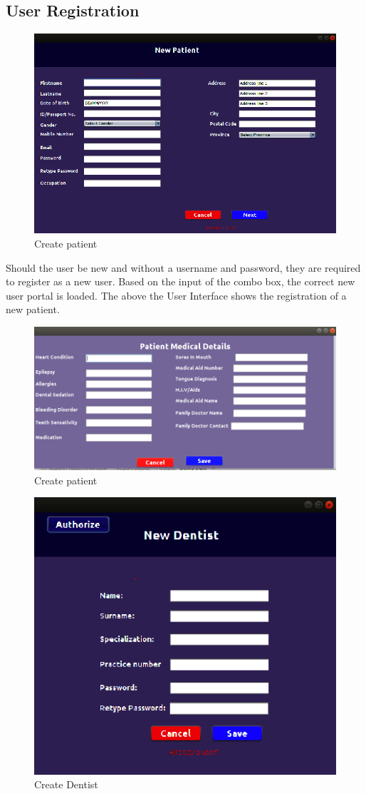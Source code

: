 \documentclass[11 pt]{article}
\begin{document}
\subsection{User Registration}
    \begin{figure}[h]
    \centering 
    \includegraphics[width=\linewidth]{UI_create_ patient.png}
    \caption{Create patient}
    \label{fig:create_patient}
    \end{figure}
 Should the user be new and without a username and password, they are required to register as a new user. Based on the input of the combo box, the correct new user portal is loaded. The above the User Interface shows the registration of a new patient. 
\begin{figure}[h]
    \centering 
    \includegraphics[width=\linewidth]{patientmedicalcond.png}
    \caption{Create patient}
    \label{fig:Patient Medical details}
    \end{figure} 
 \begin{figure}[h]
 \clearpage
    \centering 
    \includegraphics[width=.6\linewidth]{new dentist.png}
    \caption{Create Dentist}
    \label{fig:Create New Dentist}
    \end{figure}
\end{document}
